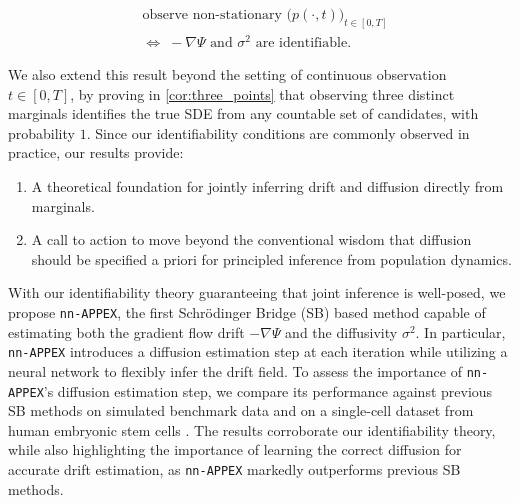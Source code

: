 \documentclass[twoside]{article}
\newcommand{\nappex}{\texttt{nn-APPEX}}
\begin{document}
\begin{mdframed}[hidealllines=true,backgroundcolor=blue!5,
                 innerleftmargin=6pt,innerrightmargin=6pt,
                 innertopmargin=6pt,innerbottommargin=6pt]
\begin{equation}
\begin{aligned}
&\text{observe non-stationary } \bigl(p(\cdot, t)\bigr)_{t \in [0,T]} \\
&\iff\; -\nabla \Psi \text{ and } \sigma^2 \text{ are identifiable}.
\end{aligned}
\end{equation}
\end{mdframed}
We also extend this result beyond the setting of continuous observation $t \in [0,T]$, by proving in \cref{cor:three_points} that observing three distinct marginals identifies the true SDE from any countable set of candidates, with probability $1$. Since our identifiability conditions are commonly observed in practice, our results provide:
\begin{enumerate}
    \item A theoretical foundation for jointly inferring drift and diffusion directly from marginals.
    \item A call to action to move beyond the conventional wisdom that diffusion should be specified a priori for principled inference from population dynamics.
\end{enumerate}
With our identifiability theory guaranteeing that joint inference is well-posed, we propose \nappex, the first Schr\"odinger Bridge (SB) based method capable of estimating both the gradient flow drift $-\nabla \Psi$ and the diffusivity $\sigma^2$. In particular, \nappex{} introduces a diffusion estimation step at each iteration while utilizing a neural network to flexibly infer the drift field. To assess the importance of \nappex's diffusion estimation step, we compare its performance against previous SB methods on simulated benchmark data \citep{terpin2024learning, persiianov2025learning} and on a single-cell dataset from human embryonic stem cells \citep{chu2016single,shen2025multi}. The results corroborate our identifiability theory, while also highlighting the importance of learning the correct diffusion for accurate drift estimation, as \nappex{} markedly outperforms previous SB methods. 

\end{document}
